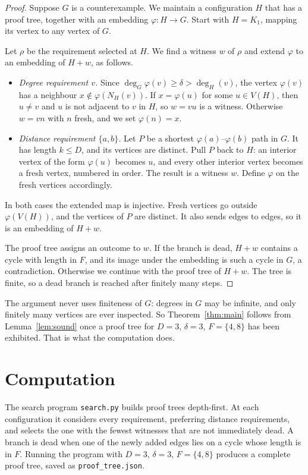 \documentclass[11pt]{article}
\theoremstyle{remark}
\begin{document}
\begin{proof}
Suppose $G$ is a counterexample. We maintain a configuration $H$ that has a proof tree, together
with an embedding $\varphi:H\to G$. Start with $H=K_1$, mapping its vertex to any vertex of $G$.

Let $\rho$ be the requirement selected at $H$. We find a witness $w$ of $\rho$ and extend $\varphi$
to an embedding of $H+w$, as follows.
\begin{itemize}
\item \emph{Degree requirement $v$.} Since $\deg_G\varphi(v)\ge\delta>\deg_H(v)$, the vertex
  $\varphi(v)$ has a neighbour $x\notin\varphi(N_H(v))$. If $x=\varphi(u)$ for some $u\in V(H)$, then
  $u\ne v$ and $u$ is not adjacent to $v$ in $H$, so $w=vu$ is a witness. Otherwise $w=vn$ with $n$
  fresh, and we set $\varphi(n)=x$.
\item \emph{Distance requirement $\{a,b\}$.} Let $P$ be a shortest $\varphi(a)$--$\varphi(b)$ path in
  $G$. It has length $k\le D$, and its vertices are distinct. Pull $P$ back to $H$: an interior
  vertex of the form $\varphi(u)$ becomes $u$, and every other interior vertex becomes a fresh
  vertex, numbered in order. The result is a witness $w$. Define $\varphi$ on the fresh vertices
  accordingly.
\end{itemize}
In both cases the extended map is injective. Fresh vertices go outside $\varphi(V(H))$, and the
vertices of $P$ are distinct. It also sends edges to edges, so it is an embedding of $H+w$.

The proof tree assigns an outcome to $w$. If the branch is dead, $H+w$ contains a cycle with length
in $F$, and its image under the embedding is such a cycle in $G$, a contradiction. Otherwise we
continue with the proof tree of $H+w$. The tree is finite, so a dead branch is reached after
finitely many steps.
\end{proof}

The argument never uses finiteness of $G$: degrees in $G$ may be infinite, and only finitely many
vertices are ever inspected. So Theorem~\ref{thm:main} follows from Lemma~\ref{lem:sound} once a
proof tree for $D=3$, $\delta=3$, $F=\{4,8\}$ has been exhibited. That is what the computation does.

\section{Computation}\label{sec:controls}

The search program \texttt{search.py} builds proof trees depth-first. At each configuration it
considers every requirement, preferring distance requirements, and selects the one with the fewest
witnesses that are not immediately dead. A branch is dead when one of the newly added edges lies on a
cycle whose length is in $F$. Running the program with $D=3$, $\delta=3$, $F=\{4,8\}$ produces a
complete proof tree, saved as \texttt{proof\_tree.json}.
\end{document}
